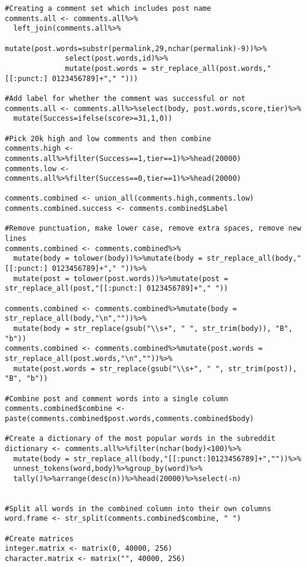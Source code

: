 \begin{lstlisting}
#Creating a comment set which includes post name
comments.all <- comments.all%>%
  left_join(comments.all%>%
              mutate(post.words=substr(permalink,29,nchar(permalink)-9))%>%
              select(post.words,id)%>%
              mutate(post.words = str_replace_all(post.words,"[[:punct:] 0123456789]+"," ")))

#Add label for whether the comment was successful or not
comments.all <- comments.all%>%select(body, post.words,score,tier)%>%
  mutate(Success=ifelse(score>=31,1,0))

#Pick 20k high and low comments and then combine
comments.high <- comments.all%>%filter(Success==1,tier==1)%>%head(20000)
comments.low <- comments.all%>%filter(Success==0,tier==1)%>%head(20000)

comments.combined <- union_all(comments.high,comments.low)
comments.combined.success <- comments.combined$Label

#Remove punctuation, make lower case, remove extra spaces, remove new lines
comments.combined <- comments.combined%>%
  mutate(body = tolower(body))%>%mutate(body = str_replace_all(body,"[[:punct:] 0123456789]+"," "))%>%
  mutate(post = tolower(post.words))%>%mutate(post = str_replace_all(post,"[[:punct:] 0123456789]+"," "))

comments.combined <- comments.combined%>%mutate(body = str_replace_all(body,"\n",""))%>%
  mutate(body = str_replace(gsub("\\s+", " ", str_trim(body)), "B", "b"))
comments.combined <- comments.combined%>%mutate(post.words = str_replace_all(post.words,"\n",""))%>%
  mutate(post.words = str_replace(gsub("\\s+", " ", str_trim(post)), "B", "b"))

#Combine post and comment words into a single column
comments.combined$combine <- paste(comments.combined$post.words,comments.combined$body)

#Create a dictionary of the most popular words in the subreddit
dictionary <- comments.all%>%filter(nchar(body)<100)%>%
  mutate(body = str_replace_all(body,"[[:punct:]0123456789]+",""))%>%
  unnest_tokens(word,body)%>%group_by(word)%>%
  tally()%>%arrange(desc(n))%>%head(20000)%>%select(-n)


#Split all words in the combined column into their own columns
word.frame <- str_split(comments.combined$combine, " ")

#Create matrices
integer.matrix <- matrix(0, 40000, 256)
character.matrix <- matrix("", 40000, 256)


\end{lstlisting}
